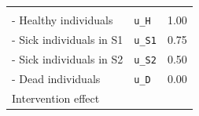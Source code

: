\documentclass[]{article}
\begin{document}
\begin{longtable}[]{@{}llc@{}}
\begin{minipage}[t]{0.20\columnwidth}
\strut
\end{minipage}\tabularnewline
\begin{minipage}[t]{0.47\columnwidth}\raggedright\strut
- Healthy individuals\strut
\end{minipage} & \begin{minipage}[t]{0.18\columnwidth}\raggedright\strut
\texttt{u\_H}\strut
\end{minipage} & \begin{minipage}[t]{0.20\columnwidth}\centering\strut
1.00\strut
\end{minipage}\tabularnewline
\begin{minipage}[t]{0.47\columnwidth}\raggedright\strut
- Sick individuals in S1\strut
\end{minipage} & \begin{minipage}[t]{0.18\columnwidth}\raggedright\strut
\texttt{u\_S1}\strut
\end{minipage} & \begin{minipage}[t]{0.20\columnwidth}\centering\strut
0.75\strut
\end{minipage}\tabularnewline
\begin{minipage}[t]{0.47\columnwidth}\raggedright\strut
- Sick individuals in S2\strut
\end{minipage} & \begin{minipage}[t]{0.18\columnwidth}\raggedright\strut
\texttt{u\_S2}\strut
\end{minipage} & \begin{minipage}[t]{0.20\columnwidth}\centering\strut
0.50\strut
\end{minipage}\tabularnewline
\begin{minipage}[t]{0.47\columnwidth}\raggedright\strut
- Dead individuals\strut
\end{minipage} & \begin{minipage}[t]{0.18\columnwidth}\raggedright\strut
\texttt{u\_D}\strut
\end{minipage} & \begin{minipage}[t]{0.20\columnwidth}\centering\strut
0.00\strut
\end{minipage}\tabularnewline
\begin{minipage}[t]{0.47\columnwidth}\raggedright\strut
Intervention effect\strut
\end{minipage} & \begin{minipage}[t]{0.18\columnwidth}\raggedright\strut
\strut
\end{minipage} & \begin{minipage}[t]{0.20\columnwidth}\centering\strut

\end{minipage}
\end{longtable}
\end{document}
